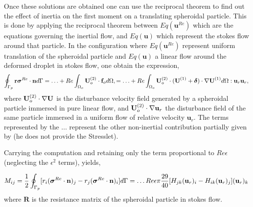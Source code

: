 \documentclass[12pt]{My_preprint}
\begin{document}
Once these solutions are obtained one can use the reciprocal theorem to find out the effect of inertia on the first moment on a translating spheroidal particle. 
This is done by applying the reciprocal theorem between $Eq(\textbf{u}^{Re})$ which are the equations governing the inertial flow, and $Eq(\textbf{u})$ which represent the stokes flow around that particle. 
In the configuration where $Eq(\textbf{u}^{Re})$ represent uniform translation of the spheroidal particle and $Eq(\textbf{u})$ a linear flow around the deformed droplet in stokes flow, one obtain the expression, 
\begin{equation}
    \intS[p]{\textbf{r}\bm\sigma^{Re}\cdot \textbf{n}}
    =
    \ldots + Re\intO[o]{\textbf{U}_{o}^{(2)}\cdot \textbf{f}_{o}},
    = \ldots + Re\intO[o]{\textbf{U}_{o}^{(2)}\cdot (\textbf{U}^{(1)} + \bm\delta)\cdot \grad \textbf{U}^{(1)}} : \textbf{u}_r\textbf{u}_r,
    \label{eq:first_mom}
\end{equation}
where $\textbf{U}_{o}^{(2)}\cdot \mathbf{\nabla} \textbf{U}$ is the disturbance velocity field generated by a spheroidal particle immersed in pure linear flow, and $\textbf{U}_{o}^{(2)}\cdot \mathbf{\nabla} \textbf{u}_r$ the disturbance field of the same particle immersed in a uniform flow of relative velocity $\textbf{u}_r$. 
The terms represented by the $\ldots$ represent the other non-inertial contribution partially  given by \citet{brenner1963resistance} (he does not provide the Stresslet). 

Carrying the computation and retaining only the term proportional to $Re \epsilon$ (neglecting the $\epsilon^2$ terms), yields, 

\begin{align}
    M_{ij}=
    \frac{1}{2}\intS[p]{[ r_i (\bm\sigma^{Re}\cdot \textbf{n})_j- r_j (\bm\sigma^{Re}\cdot \textbf{n})_i]}
    =
    \ldots
      Re \epsilon \pi
    \frac{29}{40}[H_{jk}(\textbf{u}_r)_i - H_{ik}(\textbf{u}_r)_j ] (\textbf{u}_r)_k
    \label{eq:first_mom}
\end{align}
where $\textbf{R}$ is the resistance matrix of the spheroidal particle in stokes flow. 
\end{document}
